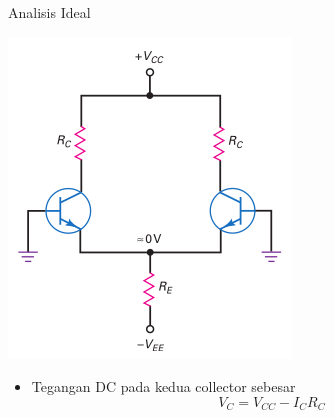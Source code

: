 \documentclass[aspectratio=169]{beamer}
\begin{document}
\begin{frame}{Analisis Ideal}
	\begin{multicols}{2}
		\begin{center}
			\includegraphics[width=0.7\textheight]{gambar/01.diff-amp/01.ideal_dc_analysis}
		\end{center}
		\columnbreak
		\begin{itemize}
			\item Tegangan DC pada kedua collector sebesar \\
			\begin{equation} \label{pers.7}
				V_C = V_{CC} - I_C R_C
			\end{equation}
		\end{itemize}
		\vfill\null
	\end{multicols}
\end{frame}
\end{document}
